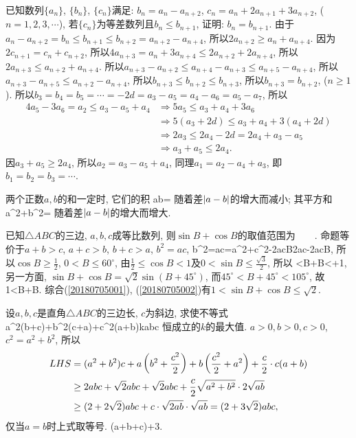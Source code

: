 \bq{}{}
已知数列$\{a_n\}$, $\{b_n\}$, $\{c_n\}$满足: $b_n=a_n-a_{n+2}$, $c_n=a_n+2a_{n+1}+3a_{n+2}$, ($n=1,2,3,\cdots$),
若$\{c_n\}$为等差数列且$b_n\le b_{n+1}$, 证明: $b_n=b_{n+1}$.
\eq
\ba
由于$a_n-a_{n+2}=b_{n}\le b_{n+1}\le b_{n+2}=a_{n+2}-a_{n+4}$, 所以$2a_{n+2}\ge a_n+a_{n+4}$.
因为$2c_{n+1}=c_n+c_{n+2}$, 所以$4a_{n+3}=a_{n}+3a_{n+4}\le 2a_{n+2}+2a_{n+4}$, 
所以$2a_{n+3}\le a_{n+2}+a_{n+4}$. 所以$a_{n+3}-a_{n+2}\le a_{n+4}-a_{n+3}\le a_{n+5}-a_{n+4}$, 
所以$a_{n+3}-a_{n+5}\le a_{n+2}-a_{n+4}$, 所以$b_{n+3}\le b_{n+2}\le b_{n+3}$,
所以$b_{n+3}=b_{n+2}$, ($n\ge1$). 所以$b_3=b_4=b_5=\cdots=-2d=a_3-a_5=a_4-a_6=a_5-a_7$, 
所以
\begin{align*}
 4a_5-3a_6=a_2\le a_3-a_5+a_4
 &\Longrightarrow 5a_5\le a_3+a_4+3a_6\\
 &\Longrightarrow 5(a_3+2d)\le a_3+a_4+3(a_4+2d)\\
 &\Longrightarrow 2a_3\le2a_4-2d=2a_4+a_3-a_5\\
 &\Longrightarrow a_3+a_5\le 2a_4.
\end{align*}
因$a_3+a_5\ge2a_4$, 所以$a_2=a_3-a_5+a_4$, 同理$a_1=a_2-a_4+a_3$,
即$b_1=b_2=b_3=\cdots$.

两个正数$a,b$的和一定时, 它们的积
\be
ab=
\ee
随着差$\left\lvert a-b\right\rvert$的增大而减小;
其平方和
\be
a^2+b^2=
\ee
随着差$\left\lvert a-b\right\rvert$的增大而增大.
\ea

\bq{}{}
已知$\triangle ABC$的三边, $a, b,c$成等比数列, 则$\sin B+\cos B$的取值范围为\underline{$\qquad$}.
\eq
\ba
命题等价于$a+b>c$, $a+c>b$, $b+c>a$, $b^2=ac$,
\bee
b^2=ac=a^2+c^2-2ac\cos B\ge2ac-2ac\cos B,
\eee
所以$\cos B\ge\frac12$, $0<B\le60^{\circ}$, 由$\frac12\le\cos B<1$及$0<\sin B\le\frac{\sqrt{3}}{2}$,
所以
\be\label{20180705001}
<\cos B+\sin B<+1,
\ee
另一方面, $\sin B+\cos B=\sqrt{2}\sin(B+45^{\circ})$, 而$45^{\circ}<B+45^{\circ}<105^{\circ}$,
故
\be\label{20180705002}
1<\sin B+\cos B\le {}.
\ee
综合(\ref{20180705001}), (\ref{20180705002})有$1<\sin B+\cos B\le\sqrt{2}$.
\ea

\bq{}{}
设$a,b,c$是直角$\triangle ABC$的三边长, $c$为斜边, 求使不等式
\bee
a^2(b+c)+b^2(c+a)+c^2(a+b)\ge kabc
\eee
恒成立的$k$的最大值.
\eq
\ba
$a>0, b>0, c>0$, $c^2=a^2+b^2$, 所以
\begin{align*}
 LHS&=(a^2+b^2)c+a\left(b^2+\frac{c^2}{2}\right)+b\left(\frac{c^2}{2}+a^2\right)+\frac{c}{2}\cdot c(a+b)\\
  &\ge 2abc+\sqrt{2}abc+\sqrt{2}abc+\frac{c}{2}\sqrt{a^2+b^2}\cdot2\sqrt{ab}\\
  &\ge (2+2\sqrt{2})abc+c\cdot\sqrt{2ab}\cdot\sqrt{ab}=(2+3\sqrt{2})abc,
\end{align*}
仅当$a=b$时上式取等号.
\bee
(a+b+c)+3.
\eee
\ea

